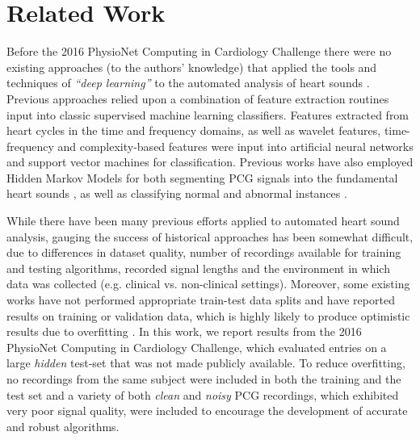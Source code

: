 \documentclass{article}
\begin{document}
\section{Related Work}
\label{sec:relatedwork}

Before the 2016 PhysioNet Computing in Cardiology Challenge there were no existing approaches (to the authors' knowledge) that applied the tools and techniques of \emph{``deep learning''} to the automated analysis of heart sounds \cite{liu2016open}. Previous approaches relied upon a combination of feature extraction routines input into classic supervised machine learning classifiers. Features extracted from heart cycles in the time and frequency domains, as well as wavelet features, time-frequency and complexity-based features were input into artificial neural networks \cite{de2007automated,uuguz2012adaptive,uuguz2012biomedical,sepehri2008computerized,bhatikar2005classifier} and support vector machines \cite{maglogiannis2009support,ari2010detection,zheng2015novel} for classification. Previous works have also employed Hidden Markov Models for both segmenting PCG signals into the fundamental heart sounds \cite{springer2014support,springer2016logistic}, as well as classifying normal and abnormal instances \cite{wang2007phonocardiographic,DBLP:journals/eaai/Saracoglu12}.

While there have been many previous efforts applied to automated heart sound analysis, gauging the success of historical approaches has been somewhat difficult, due to differences in dataset quality, number of recordings available for training and testing algorithms, recorded signal lengths and the environment in which data was collected (e.g. clinical vs. non-clinical settings). Moreover, some existing works have not performed appropriate train-test data splits and have reported results on training or validation data, which is highly likely to produce optimistic results due to overfitting \cite{liu2016open}. In this work, we report results from the 2016 PhysioNet Computing in Cardiology Challenge, which evaluated entries on a large \emph{hidden} test-set that was not made publicly available. To reduce overfitting, no recordings from the same subject were included in both the training and the test set and a variety of both \emph{clean} and \emph{noisy} PCG recordings, which exhibited very poor signal quality, were included to encourage the development of accurate and robust algorithms.
\end{document}
